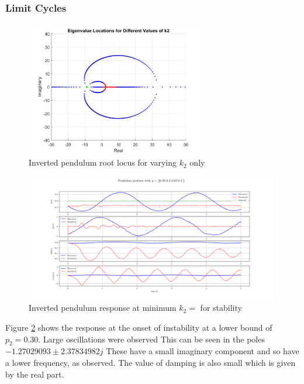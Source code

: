 \documentclass{article}
\begin{document}
\subsubsection{Limit Cycles}

\begin{figure}[H]
  \centering
  \includegraphics[width=0.7\textwidth]{figures/4.4roots.jpg}
  \caption{Inverted pendulum root locus for varying $k_2$ only}
  \label{fig:roots4.4}
\end{figure}

\begin{figure}[H]
  \centering
  \includegraphics[width=0.99\textwidth]{figures/4.4_lo.png}
  \caption{Inverted pendulum response at minimum $k_2 = $ for stability}
  \label{fig:roots4.4_lo}
\end{figure}

Figure \ref{fig:roots4.4_lo} shows the response at the onset of instability at a lower bound of $p_2 = 0.30$.
Large oscillations were observed 
This can be seen in the poles $-1.27029093 \pm 2.37834982j$
These have a small imaginary component and so have a lower frequency, as observed.
The value of damping is also small which is given by the real part.
\end{document}
